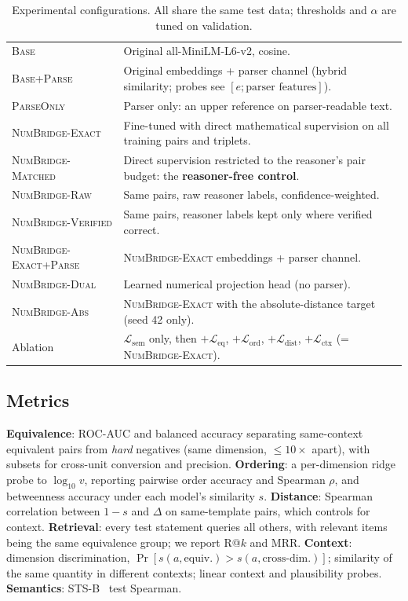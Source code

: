 \documentclass[11pt]{article}
\newcommand{\Lq}{\mathcal{L}}
\newcommand{\vBase}{\textup{\textsc{Base}}\xspace}                      %
\newcommand{\vParse}{\textup{\textsc{Base+Parse}}\xspace}                %
\newcommand{\vParseOnly}{\textup{\textsc{ParseOnly}}\xspace}             %
\newcommand{\vExact}{\textup{\textsc{NumBridge-Exact}}\xspace}           %
\newcommand{\vMatched}{\textup{\textsc{NumBridge-Matched}}\xspace}       %
\newcommand{\vRaw}{\textup{\textsc{NumBridge-Raw}}\xspace}               %
\newcommand{\vVerified}{\textup{\textsc{NumBridge-Verified}}\xspace}     %
\newcommand{\vExactParse}{\textup{\textsc{NumBridge-Exact+Parse}}\xspace}%
\newcommand{\vDual}{\textup{\textsc{NumBridge-Dual}}\xspace}             %
\newcommand{\vAbs}{\textup{\textsc{NumBridge-Abs}}\xspace}               %
\begin{document}
\begin{table}[t]
\centering\small
\caption{Experimental configurations. All share the same test data; thresholds and $\alpha$ are tuned on validation.}
\label{tab:configs}
\begin{tabular}{@{}l>{\raggedright\arraybackslash}p{10.5cm}@{}}
\toprule
\vBase & Original all-MiniLM-L6-v2, cosine. \\
\vParse & Original embeddings + parser channel (hybrid similarity; probes see $[e;\text{parser features}]$). \\
\vParseOnly & Parser only: an upper reference on parser-readable text. \\
\vExact & Fine-tuned with direct mathematical supervision on all training pairs and triplets. \\
\vMatched & Direct supervision restricted to the reasoner's pair budget: the \textbf{reasoner-free control}. \\
\vRaw & Same pairs, raw reasoner labels, confidence-weighted. \\
\vVerified & Same pairs, reasoner labels kept only where verified correct. \\
\vExactParse & \vExact embeddings + parser channel. \\
\vDual & Learned numerical projection head (no parser). \\
\vAbs & \vExact with the absolute-distance target (seed 42 only). \\
Ablation & $\Lq_{\mathrm{sem}}$ only, then $+\Lq_{\mathrm{eq}}$, $+\Lq_{\mathrm{ord}}$, $+\Lq_{\mathrm{dist}}$, $+\Lq_{\mathrm{ctx}}$ (= \vExact). \\
\bottomrule
\end{tabular}
\end{table}

\subsection{Metrics}
\textbf{Equivalence}: ROC-AUC and balanced accuracy separating same-context equivalent pairs from \emph{hard}
negatives (same dimension, $\le10\times$ apart), with subsets for cross-unit conversion and precision.
\textbf{Ordering}: a per-dimension ridge probe to $\log_{10}v$, reporting pairwise order accuracy and Spearman $\rho$,
and betweenness accuracy under each model's similarity $s$. \textbf{Distance}: Spearman correlation between $1-s$ and $\Delta$ on
same-template pairs, which controls for context. \textbf{Retrieval}: every test statement queries all others, with
relevant items being the same equivalence group; we report R@$k$ and MRR. \textbf{Context}: dimension discrimination,
$\Pr[s(a,\text{equiv.})>s(a,\text{cross-dim.})]$; similarity of the same quantity in different contexts; linear
context and plausibility probes. \textbf{Semantics}: STS-B~\cite{cer2017sts} test Spearman.
\end{document}
